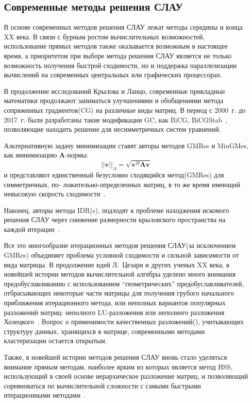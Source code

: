 \subsection{Современные методы решения СЛАУ}
В основе современных методов решения СЛАУ лежат методы середины и конца XX века. В связи с бурным ростом вычислительных возможностей, использование прямых методов также оказывается возможным в настоящее время, а приоритетом при выборе метода решения СЛАУ является не только возможность получения быстрой сходимости, но и поддержка параллелизации вычислений на современных центральных или графических процессорах.


В продолжение исследований Крылова и Ланцо, современные прикладные математики продолжают заниматься улучшениями и обобщениями метода сопряженных градиентов(CG) на различные виды матриц. В период с 2000~г. до 2017~г. были разработаны такие модификации GC, как BiCG, BiCGStab~\cite{solverOverwiev}, позволяющие находить решение для несимметричных систем уравнений.


Альтернативную задачу минимизации ставят авторы методов GMRes и MinGMes, как минимизацию $\mathbf{A}$-нормы:
\[
||\mathbf{v}||_A = \sqrt{\mathbf{v}^H \mathbf{A} \mathbf{v}}
\]
и представляют единственный безусловно сходящийся метод(GMRes) для симметричных, по- ложительно-определенных матриц, в то же время имеющий невысокую скорость сходимости~\cite{solverOverwiev}.


Наконец, авторы метода IDR(s), подходят к проблеме находжения искомого решения СЛАУ через снижение размерности крыловского пространства на каждой итерации~\cite{baseIDRs, advancedIDRs}.


Все это многообразие итерационных методов решения СЛАУ(за исключением GMRes) объединяет проблема условной сходимости и сильной зависимости от вида матрицы. В продолжение идей Л.~Цезари и других ученых XX века, в новейшей истории методов вычислительной алгебры уделено много внимания предобуславливанию с использованием ``геометрических'' предобуславливателей, отбрасывающих некоторые части матрицы для получения грубого начального приближения итерационного метода, или неполных вариантов популярных разложений матриц: неполного LU-разложения или неполного разложения Холецкого~\cite{solverOverwiev}. Вопрос о применимости качественных разложений(\cite{fitSVD, fastSVD}), учитывающих структуру данных, хранящихся в матрице, современными методами кластеризации остается открытым.


Также, в новейшей истории методов решения СЛАУ вновь стало уделяться внимание прямым методам, наиболее ярким из которых является метод HSS, использующий в своей основе иерархическое разложение матриц, и позволяющий соревноваться по вычислительной сложности с самыми быстрыми итерационными методами~\cite{baseHSS, fastHSS}.


